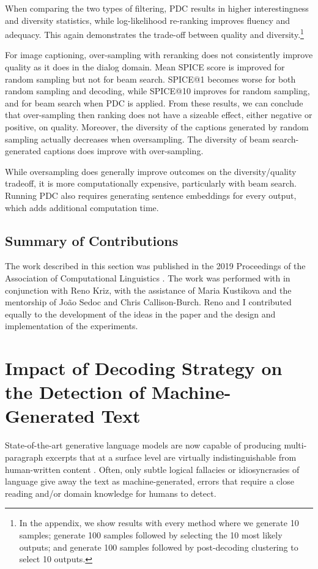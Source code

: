 When comparing the two types of filtering, PDC results in higher interestingness and diversity statistics, while log-likelihood re-ranking improves fluency and adequacy.
This again demonstrates the trade-off between quality and diversity.\footnote{In the appendix, we show results with every method where we generate 10 samples; generate 100 samples followed by selecting the 10 most likely outputs; and generate 100 samples followed by post-decoding clustering to select 10 outputs.}

For image captioning, over-sampling with reranking does not consistently improve quality as it does in the dialog domain.
Mean SPICE score is improved for random sampling but not for beam search. 
SPICE@1 becomes worse for both random sampling and decoding, while SPICE@10 improves for random sampling, and for beam search when PDC is applied.
From these results, we can conclude that over-sampling then ranking does not have a sizeable effect, either negative or positive, on quality.
Moreover, the diversity of the captions generated by random sampling actually decreases when oversampling. The diversity of beam search-generated captions does improve with over-sampling.

While oversampling does generally improve outcomes on the diversity/quality tradeoff, it is more computationally expensive, particularly with beam search.
Running PDC also requires generating sentence embeddings for every output, which adds additional computation time.



\subsection{Summary of Contributions}
The work described in this section was published in the 2019 Proceedings of the Association of Computational Linguistics \citep{ippolito2019comparison}.
The work was performed with in conjunction with Reno Kriz, with the assistance of Maria Kustikova and the mentorship of Jo{\~a}o Sedoc and Chris Callison-Burch.
Reno and I contributed equally to the development of the ideas in the paper and the design and implementation of the experiments.

\section{Impact of Decoding Strategy on the Detection of Machine-Generated Text}
\label{section:detection}


State-of-the-art generative language models are now capable of producing multi-paragraph excerpts that at a surface level are virtually indistinguishable from human-written content \citep{zellers2019defending,radford2019language,adelani2020generating}.
Often, only subtle logical fallacies or idiosyncrasies of language give away the text as machine-generated, errors that require a close reading and/or domain knowledge for humans to detect.

